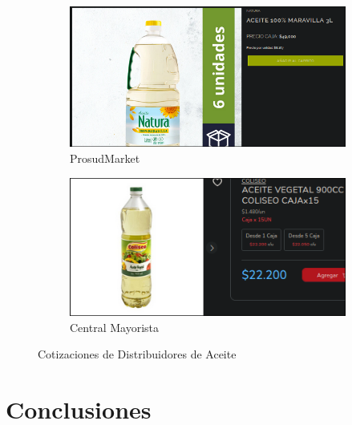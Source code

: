 \documentclass[12pt]{article}
\begin{document}
\begin{figure}[h]
            \begin{subfigure}{0.45\textwidth}
                \centering
                \includegraphics[width=0.9\linewidth]{prosud} %
                \caption{ProsudMarket}
                \label{fig:prosudmarket}
            \end{subfigure}
            \begin{subfigure}{0.45\textwidth}
                \centering
                \includegraphics[width=0.9\linewidth]{aceite} %
                \caption{Central Mayorista}
                \label{fig:central_mayorista_aceite}
            \end{subfigure}
            \caption{Cotizaciones de Distribuidores de Aceite}
            \label{fig:cotizaciones_aceite}
        \end{figure}

\newpage



\section{Conclusiones} %
\end{document}
